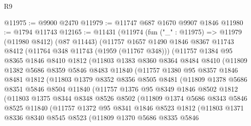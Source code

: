 \begin{lexlean}{R9}
\begin{coremodule}
@11975 := @9900 @2470
@11979 := @11747 @687 @1670 @9907 @1846
@11980 := @1794 @11743
@12165 := @11431
    (@11974
      (fun ("_" : @11975) =>
      @11979
        (@11980 @8412)
        (@87 @11443)
        (@11757
          @1657
          @1490
          @1846
          @8367
          @11743
          @8412
          (@11764 @348 @11743 (@1959 (@11767 @348)))
          (@11757
            @1384
            @95
            @8365
            @1846
            @8410
            @1812
            (@11803
              @1383
              @8360
              @8364
              @8484
              @8410
              (@11809
                @1382
                @5686
                @8359
                @5846
                @8483
                @11840
                (@11757
                  @1380
                  @95
                  @8357
                  @1846
                  @8481
                  @1812
                  (@11803
                    @1379
                    @8352
                    @8356
                    @8505
                    @8481
                    (@11809
                      @1378
                      @5686
                      @8351
                      @5846
                      @8504
                      @11840
                      (@11757
                        @1376
                        @95
                        @8349
                        @1846
                        @8502
                        @1812
                        (@11803
                          @1375
                          @8344
                          @8348
                          @8526
                          @8502
                          (@11809
                            @1374
                            @5686
                            @8343
                            @5846
                            @8525
                            @11840
                            (@11757
                              @1372
                              @95
                              @8341
                              @1846
                              @8523
                              @1812
                              (@11803
                                @1371
                                @8336
                                @8340
                                @8545
                                @8523
                                (@11809
                                  @1370
                                  @5686
                                  @8335
                                  @5846

\end{coremodule}
\end{lexlean}
